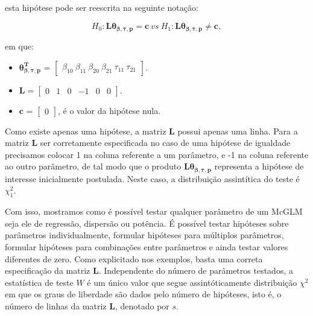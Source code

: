 \noindent esta hipótese pode ser reescrita na seguinte notação:

$$H_0: \boldsymbol{L}\boldsymbol{\theta_{\beta,\tau,p}} = \boldsymbol{c} \ vs \ H_1: \boldsymbol{L}\boldsymbol{\theta_{\beta,\tau,p}} \neq \boldsymbol{c},$$ 

\noindent em que:

\begin{itemize}
  
  \item $\boldsymbol{\theta_{\beta,\tau,p}^T}$ = $\begin{bmatrix} \beta_{10} \  \beta_{11} \ \beta_{20} \ \beta_{21} \ \tau_{11} \ \tau_{21} \end{bmatrix}$.


\item $\boldsymbol{L} = \begin{bmatrix} 0 & 1 & 0 & -1 & 0 & 0  \end{bmatrix}.$
 
\item $\boldsymbol{c}$ = $\begin{bmatrix} 0 \end{bmatrix}$, é o valor da hipótese nula. 

\end{itemize}

Como existe apenas uma hipótese, a matriz $\boldsymbol{L}$ possui apenas uma linha. Para a matriz $\boldsymbol{L}$ ser corretamente especificada no caso de uma hipótese de igualdade precisamos colocar 1 na coluna referente a um parâmetro, e -1 na coluna referente ao outro parâmetro, de tal modo que o produto $\boldsymbol{L}\boldsymbol{\theta_{\beta,\tau,p}}$ representa a hipótese de interesse inicialmente postulada. Neste caso, a distribuição assintítica do teste é $\chi^2_1$.

Com isso, mostramos como é possível testar qualquer parâmetro de um McGLM seja ele de regressão, dispersão ou potência. É possível testar hipóteses sobre parâmetros individualmente, formular hipóteses para múltiplos parâmetros, formular hipóteses para combinações entre parâmetros e ainda testar valores diferentes de zero. Como explicitado nos exemplos, basta uma correta especificação da matriz $\boldsymbol{L}$. Independente do número de parâmetros testados, a estatística de teste $W$ é um único valor que segue assintóticamente distribuição $\chi^2$ em que os graus de liberdade são dados pelo número de hipóteses, isto é, o número de linhas da matriz $\boldsymbol{L}$, denotado por $s$.

